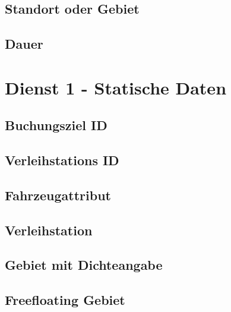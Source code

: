 \subsection*{Standort oder Gebiet}



\subsection*{Dauer}



\section{Dienst 1 - Statische Daten}
\label{sec:Datenmodell:Dienst1}

\subsection*{Buchungsziel ID}



\subsection*{Verleihstations ID}



\subsection*{Fahrzeugattribut}



\subsection*{Verleihstation}



\subsection*{Gebiet mit Dichteangabe}



\subsection*{Freefloating Gebiet}



